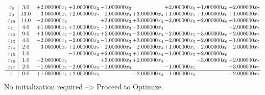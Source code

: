 \documentclass[10pt]{article}
\begin{document}
\[\begin{array}{c| c c@{\hskip 2pt} c@{\hskip 2pt} c@{\hskip 2pt} c@{\hskip 2pt} c@{\hskip 2pt} c@{\hskip 2pt} c@{\hskip 2pt} }
 x_{8}   &  3.0 & + 2.000000 x_{1} & + 3.000000 x_{2} & -1.000000 x_{3} &   & + 2.000000 x_{5} & + 1.000000 x_{6} & + 2.000000 x_{7}\\
 x_{9}   &  13.0 & -3.000000 x_{1} & + 2.000000 x_{2} & -1.000000 x_{3} & + 3.000000 x_{4} & + 1.000000 x_{5} & + 1.000000 x_{6} & + 1.000000 x_{7}\\
 x_{10}   &  14.0 & -2.000000 x_{1} &   & + 3.000000 x_{3} & + 3.000000 x_{4} & -2.000000 x_{5} & + 2.000000 x_{6} & + 1.000000 x_{7}\\
 x_{11}   &  4.0 & + 1.000000 x_{1} & + 1.000000 x_{2} & -1.000000 x_{3} & -3.000000 x_{4} &    &   & -2.000000 x_{7}\\
 x_{12}   &  9.0 & + 3.000000 x_{1} & -2.000000 x_{2} & + 2.000000 x_{3} & -3.000000 x_{4} & -2.000000 x_{5} & -3.000000 x_{6} & -2.000000 x_{7}\\
 x_{13}   &  4.0 & -2.000000 x_{1} & -2.000000 x_{2} & -1.000000 x_{3} & + 3.000000 x_{4} & -2.000000 x_{5} & -2.000000 x_{6} & -1.000000 x_{7}\\
 x_{14}   &  2.0 & -3.000000 x_{1} & + 1.000000 x_{2} & -1.000000 x_{3} & -2.000000 x_{4} & + 1.000000 x_{5} & -2.000000 x_{6} & -2.000000 x_{7}\\
 x_{15}   &  1.0  &   & -1.000000 x_{2} & + 2.000000 x_{3} & + 1.000000 x_{4} & -1.000000 x_{5} & + 2.000000 x_{6} &   \\
 x_{16}   &  1.0 & -2.000000 x_{1} &   & + 3.000000 x_{3} & + 2.000000 x_{4} &   & -3.000000 x_{6} & + 2.000000 x_{7}\\
 x_{17}   &  2.0 & -1.000000 x_{1} & -2.000000 x_{2} & -1.000000 x_{3} &   & -1.000000 x_{5} &   & + 3.000000 x_{7}\\
\hline
z    &  0.0 & + 1.000000 x_{1} & + 2.000000 x_{2} &   & -2.000000 x_{4} & -1.000000 x_{5} &   & -2.000000 x_{7}\\
\end{array}\]
No initialization required --> Proceed to Optimize. 
\end{document}
